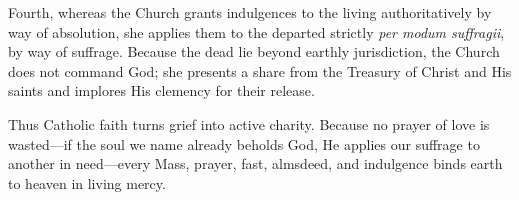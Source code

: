 Fourth, whereas the Church grants indulgences to the living authoritatively by way of absolution, she applies them to the departed strictly \textit{per modum suffragii}, by way of suffrage. Because the dead lie beyond earthly jurisdiction, the Church does not command God; she presents a share from the Treasury of Christ and His saints and implores His clemency for their release.

Thus Catholic faith turns grief into active charity. Because no prayer of love is wasted---if the soul we name already beholds God, He applies our suffrage to another in need---every Mass, prayer, fast, almsdeed, and indulgence binds earth to heaven in living mercy.
